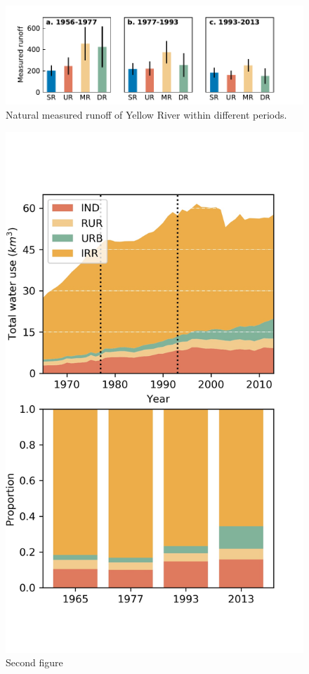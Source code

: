 \documentclass[9pt,twoside,lineno]{pnas-new}
\begin{document}
\begin{figure}
\centering
\includegraphics[width=\textwidth]{../../figures/supplementary_information/sf_measured_runoff.pdf}
\caption{Natural measured runoff of Yellow River within different periods.}
\end{figure}

\begin{figure}
\centering
\includegraphics[width=\textwidth]{../../figures/supplementary_information/sf_wu_sections_stackplot.jpg}
\caption{Second figure}
\end{figure}
\end{document}
